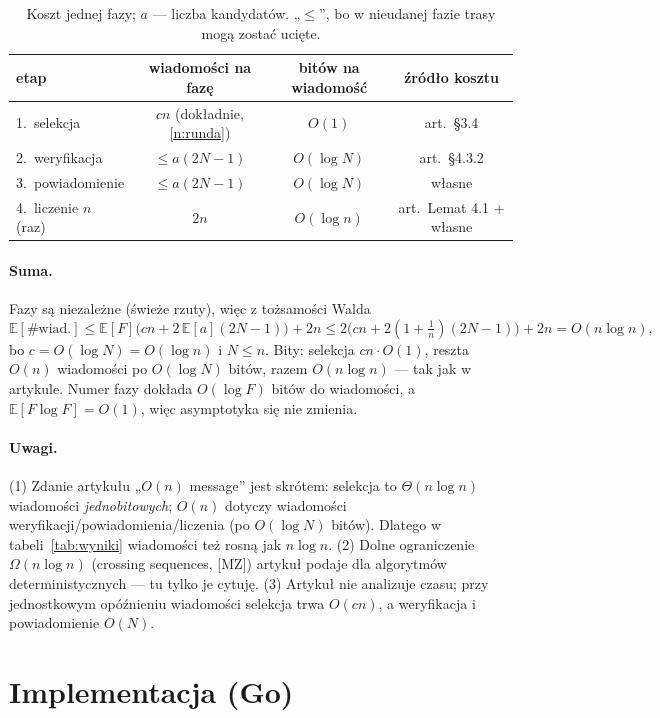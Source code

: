 \documentclass[11pt,a4paper]{article}
\theoremstyle{definition}
\begin{document}
\begin{table}[h]
\centering\small
\begin{tabular}{lccc}
\toprule
etap & wiadomości na fazę & bitów na wiadomość & źródło kosztu \\
\midrule
1.\ selekcja & $cn$ (dokładnie, \ref{n:runda}) & $O(1)$ & art.\ §3.4 \\
2.\ weryfikacja & $\le a(2N-1)$ & $O(\log N)$ & art.\ §4.3.2 \\
3.\ powiadomienie & $\le a(2N-1)$ & $O(\log N)$ & własne \\
4.\ liczenie $n$ (raz) & $2n$ & $O(\log n)$ & art.\ Lemat 4.1 + własne \\
\bottomrule
\end{tabular}
\caption{Koszt jednej fazy; $a$ — liczba kandydatów. „$\le$”, bo w nieudanej fazie trasy mogą zostać ucięte.}
\label{tab:koszt}
\end{table}

\paragraph{Suma.} Fazy są niezależne (świeże rzuty), więc z tożsamości Walda
\[
\mathbb{E}[\#\text{wiad.}]\le\mathbb{E}[F]\big(cn+2\,\mathbb{E}[a](2N-1)\big)+2n
\le 2\big(cn+2(1+\tfrac1n)(2N-1)\big)+2n=O(n\log n),
\]
bo $c=O(\log N)=O(\log n)$ i $N\le n$. Bity: selekcja $cn\cdot O(1)$, reszta $O(n)$ wiadomości po
$O(\log N)$ bitów, razem $O(n\log n)$ — tak jak w artykule. Numer fazy dokłada $O(\log F)$ bitów do
wiadomości, a $\mathbb{E}[F\log F]=O(1)$, więc asymptotyka się nie zmienia.

\paragraph{Uwagi.} (1) Zdanie artykułu „$O(n)$ message” jest skrótem: selekcja to $\Theta(n\log n)$
wiadomości \emph{jednobitowych}; $O(n)$ dotyczy wiadomości weryfikacji/powiadomienia/liczenia (po $O(\log N)$
bitów). Dlatego w tabeli~\ref{tab:wyniki} wiadomości też rosną jak $n\log n$. (2) Dolne ograniczenie
$\Omega(n\log n)$ (crossing sequences, [MZ]) artykuł podaje dla algorytmów deterministycznych — tu tylko je
cytuję. (3) Artykuł nie analizuje czasu; przy jednostkowym opóźnieniu wiadomości selekcja trwa $O(cn)$,
a weryfikacja i powiadomienie $O(N)$.

\section{Implementacja (Go)}
\end{document}
